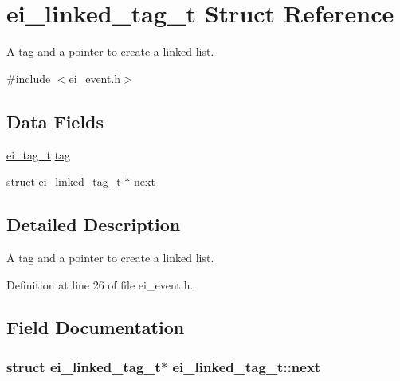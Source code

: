 \hypertarget{structei__linked__tag__t}{\section{ei\-\_\-linked\-\_\-tag\-\_\-t Struct Reference}
\label{structei__linked__tag__t}
}


A tag and a pointer to create a linked list.  




{\ttfamily \#include $<$ei\-\_\-event.\-h$>$}

\subsection*{Data Fields}
\begin{DoxyCompactItemize}
\item 
\hyperlink{ei__event_8h_a24a8242260cfd8ddb6ef915f3de5a10f}{ei\-\_\-tag\-\_\-t} \hyperlink{structei__linked__tag__t_aa1c771b8b7ac760ee10d33d5a29c97d7}{tag}
\item 
struct \hyperlink{structei__linked__tag__t}{ei\-\_\-linked\-\_\-tag\-\_\-t} $\ast$ \hyperlink{structei__linked__tag__t_a86bfd7536ee8b26a3f2b1a46562591e4}{next}
\end{DoxyCompactItemize}


\subsection{Detailed Description}
A tag and a pointer to create a linked list. 

Definition at line 26 of file ei\-\_\-event.\-h.



\subsection{Field Documentation}
\hypertarget{structei__linked__tag__t_a86bfd7536ee8b26a3f2b1a46562591e4}{
\subsubsection[{next}]{\setlength{\rightskip}{0pt plus 5cm}struct {\bf ei\-\_\-linked\-\_\-tag\-\_\-t}$\ast$ ei\-\_\-linked\-\_\-tag\-\_\-t\-::next}}\label{structei__linked__tag__t_a86bfd7536ee8b26a3f2b1a46562591e4}


